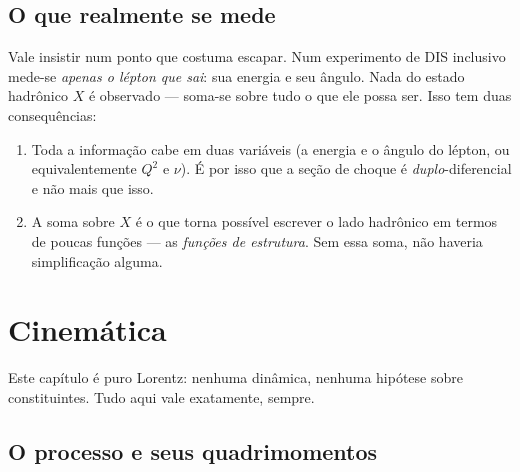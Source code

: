 \documentclass[11pt,a4paper,oneside]{report}
\newcommand{\Qsq}{Q^{2}}
\begin{document}
\section{O que realmente se mede}

Vale insistir num ponto que costuma escapar. Num experimento de DIS inclusivo
mede-se \emph{apenas o lépton que sai}: sua energia e seu ângulo. Nada do estado
hadrônico $X$ é observado --- soma-se sobre tudo o que ele possa ser. Isso tem
duas consequências:

\begin{enumerate}[leftmargin=*]
\item Toda a informação cabe em duas variáveis (a energia e o ângulo do lépton,
  ou equivalentemente $\Qsq$ e $\nu$). É por isso que a seção de choque é
  \emph{duplo}-diferencial e não mais que isso.
\item A soma sobre $X$ é o que torna possível escrever o lado hadrônico em
  termos de poucas funções --- as \emph{funções de estrutura}. Sem essa soma,
  não haveria simplificação alguma.
\end{enumerate}

\chapter{Cinemática}
\label{cap:cinematica}

Este capítulo é puro Lorentz: nenhuma dinâmica, nenhuma hipótese sobre
constituintes. Tudo aqui vale exatamente, sempre.

\section{O processo e seus quadrimomentos}
\end{document}

